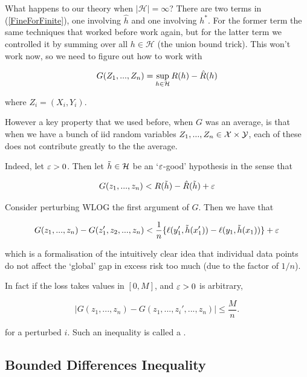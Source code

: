 \documentclass[11pt]{scrartcl}
\begin{document}
What happens to our theory when $|\mathcal{H}| = \infty$? There are two terms in (\ref{FineForFinite}), one involving $\hat{h}$ and one involving $h^*$. For the former term the same techniques that worked before work again, but for the latter term we controlled it by summing over all $h \in \mathcal{H}$ (the union bound trick). This won't work now, so we need to figure out how to work with 

\begin{equation}
    G(Z_1, ... , Z_n) = \sup_{h \in \mathcal{H}} R(h) - \hat{R}(h)
\label{G definition}
\end{equation}

where $Z_i = (X_i, Y_i)$.

However a key property that we used before, when $G$ was an average, is that when we have a bunch of iid random variables $Z_1, ... , Z_n \in \mathcal{X} \times \mathcal{Y}$, each of these does not contribute greatly to the the average. 

Indeed, let $\varepsilon > 0$. Then let $\tilde{h} \in \mathcal{H}$ be an `$\varepsilon$-good' hypothesis in the sense that 

\begin{equation}
    G(z_1, ... , z_n) < R(\tilde{h}) - \hat{R}(\tilde{h}) + \varepsilon
\end{equation}

Consider perturbing WLOG the first argument of $G$. Then we have that

\begin{equation}
    G(z_1, ... , z_n) - G(z_1', z_2, ... , z_n) < \frac1n \{ \ell(y_1', \tilde{h}(x_1')) - \ell(y_1, \tilde{h}(x_1)) \} + \varepsilon
\end{equation}

which is a formalisation of the intuitively clear idea that individual data points do not affect the `global' gap in excess risk too much (due to the factor of $1/n$).

In fact if the loss takes values in $[0, M ]$, and $\varepsilon > 0$ is arbitrary, %

\begin{equation}
    | G(z_1, ... , z_n) - G(z_1, ... , z_i', ... , z_n)| \le \frac{M}{n}.
\label{G perturb bounded diff prop}
\end{equation}

for a perturbed $i$. Such an inequality is called a .

\subsection{Bounded Differences Inequality}
\end{document}
